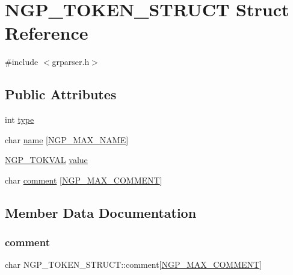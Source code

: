 \hypertarget{struct_n_g_p___t_o_k_e_n___s_t_r_u_c_t}{}\section{N\+G\+P\+\_\+\+T\+O\+K\+E\+N\+\_\+\+S\+T\+R\+U\+CT Struct Reference}
\label{struct_n_g_p___t_o_k_e_n___s_t_r_u_c_t}


{\ttfamily \#include $<$grparser.\+h$>$}

\subsection*{Public Attributes}
\begin{DoxyCompactItemize}
\item 
int \hyperlink{struct_n_g_p___t_o_k_e_n___s_t_r_u_c_t_ad27cef7357c8bf4897ad493d546bb7b2}{type}
\item 
char \hyperlink{struct_n_g_p___t_o_k_e_n___s_t_r_u_c_t_ab060bf342cf1077b7cf8edb09ea68590}{name} \mbox{[}\hyperlink{grparser_8h_a39aefe917640ed69c19f6e8969b5eb90}{N\+G\+P\+\_\+\+M\+A\+X\+\_\+\+N\+A\+ME}\mbox{]}
\item 
\hyperlink{grparser_8h_a4f6277b4646a8baa8b43febdf46f04ac}{N\+G\+P\+\_\+\+T\+O\+K\+V\+AL} \hyperlink{struct_n_g_p___t_o_k_e_n___s_t_r_u_c_t_a6b0ec44872c07b836bbe137832adb214}{value}
\item 
char \hyperlink{struct_n_g_p___t_o_k_e_n___s_t_r_u_c_t_aca7cd0ef93b897b602774be88cb06ab8}{comment} \mbox{[}\hyperlink{grparser_8h_ab97b72a0b408352b41e815c448ebf68f}{N\+G\+P\+\_\+\+M\+A\+X\+\_\+\+C\+O\+M\+M\+E\+NT}\mbox{]}
\end{DoxyCompactItemize}


\subsection{Member Data Documentation}
\mbox{\label{struct_n_g_p___t_o_k_e_n___s_t_r_u_c_t_aca7cd0ef93b897b602774be88cb06ab8}} 
\subsubsection{\texorpdfstring{comment}{comment}}
{\footnotesize\ttfamily char N\+G\+P\+\_\+\+T\+O\+K\+E\+N\+\_\+\+S\+T\+R\+U\+C\+T\+::comment\mbox{[}\hyperlink{grparser_8h_ab97b72a0b408352b41e815c448ebf68f}{N\+G\+P\+\_\+\+M\+A\+X\+\_\+\+C\+O\+M\+M\+E\+NT}\mbox{]}}

